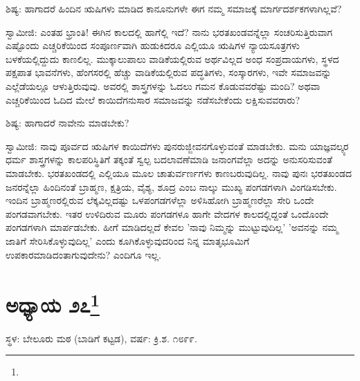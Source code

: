 ಶಿಷ್ಯ: ಹಾಗಾದರೆ ಹಿಂದಿನ ಋಷಿಗಳು ಮಾಡಿದ ಕಾನೂನುಗಳೇ ಈಗ ನಮ್ಮ ಸಮಾಜಕ್ಕೆ ಮಾರ್ಗದರ್ಶಕಗಳಾಗಿಲ್ಲವೆ?

ಸ್ವಾಮೀಜಿ: ಎಂತಹ ಭ್ರಾಂತಿ! ಈಗಿನ ಕಾಲದಲ್ಲಿ ಹಾಗೆಲ್ಲಿ ಇದೆ? ನಾನು ಭರತಖಂಡವನ್ನೆಲ್ಲಾ ಸಂಚರಿಸುತ್ತಿರುವಾಗ ಎಷ್ಟೊಂದು ಎಚ್ಚರಿಕೆಯಿಂದ ಸಂಪೂರ್ಣವಾಗಿ ಹುಡುಕಿದರೂ ಎಲ್ಲಿಯೂ ಋಷಿಗಳ ನ್ಯಾಯಸೂತ್ರಗಳು ಬಳಕೆಯಲ್ಲಿದ್ದುದು ಕಾಣಲಿಲ್ಲ. ಮುಕ್ಕಾಲುಪಾಲು ವಾಡಿಕೆಯಲ್ಲಿರುವ ಅರ್ಥವಿಲ್ಲದ ಅಂಧ ಸಂಪ್ರದಾಯಗಳು, ಸ್ಥಳದ ಪಕ್ಷಪಾತ ಭಾವನೆಗಳು, ಹೆಂಗಸರಲ್ಲಿ ಹೆಚ್ಚು ವಾಡಿಕೆಯಲ್ಲಿರುವ ಪದ್ಧತಿಗಳು, ಸಂಸ್ಕಾರಗಳು, ಇವೇ ಸಮಾಜವನ್ನು ಎಲ್ಲೆಡೆಯಲ್ಲೂ ಆಳುತ್ತಿರುವುವು. ಅವರಲ್ಲಿ ಶಾಸ್ತ್ರಗಳನ್ನು ಓದಲು ಗಮನ ಕೊಡುವವರೆಷ್ಟು ಮಂದಿ? ಅಥವಾ ಎಚ್ಚರಿಕೆಯಿಂದ ಓದಿದ ಮೇಲೆ ಕಾಯಿದೆಗನುಸಾರ ಸಮಾಜವನ್ನು ನಡೆಸಬೇಕೆಂದು ಲಕ್ಷಿಸುವವರಾರು?

ಶಿಷ್ಯ: ಹಾಗಾದರೆ ನಾವೇನು ಮಾಡಬೇಕು?

ಸ್ವಾಮೀಜಿ: ನಾವು ಪೂರ್ವದ ಋಷಿಗಳ ಕಾಯಿದೆಗಳು ಪುನರುಜ್ಜೀವನಗೊಳ್ಳುವಂತೆ ಮಾಡಬೇಕು. ಮನು ಯಾಜ್ಞವಲ್ಕ್ಯರ ಧರ್ಮ ಶಾಸ್ತ್ರಗಳನ್ನು ಕಾಲಪರಿಸ್ಥಿತಿಗೆ ತಕ್ಕಂತೆ ಸ್ವಲ್ಪ ಬದಲಾವಣೆಮಾಡಿ ಜನಾಂಗವೆಲ್ಲಾ ಅದನ್ನು ಅನುಸರಿಸುವಂತೆ ಮಾಡಬೇಕು. ಭರತಖಂಡದಲ್ಲಿ ಎಲ್ಲಿಯೂ ಮೂಲ ಚಾತುರ್ವರ್ಣಗಳು ಕಾಣಬರುವುದಿಲ್ಲ. ನಾವು ಪುನಃ ಭರತಖಂಡದ ಜನರನ್ನೆಲ್ಲಾ ಹಿಂದಿನಂತೆ ಬ್ರಾಹ್ಮಣ, ಕ್ಷತ್ರಿಯ, ವೈಶ್ಯ, ಶೂದ್ರ ಎಂಬ ನಾಲ್ಕು ಮುಖ್ಯ ಪಂಗಡಗಳಾಗಿ ವಿಂಗಡಿಸಬೇಕು. ಇಂದಿನ ಬ್ರಾಹ್ಮಣರಲ್ಲಿರುವ ಲೆಕ್ಕವಿಲ್ಲದಷ್ಟು ಒಳಪಂಗಡಗಳೆಲ್ಲಾ ಅಳಿಸಿಹೋಗಿ ಬ್ರಾಹ್ಮಣರೆಲ್ಲಾ ಸೇರಿ ಒಂದೇ ಪಂಗಡವಾಗಬೇಕು. ಇತರ ಉಳಿದಿರುವ ಮೂರು ಪಂಗಡಗಳೂ ಹಾಗೇ ವೇದಗಳ ಕಾಲದಲ್ಲಿದ್ದಂತೆ ಒಂದೊಂದೇ ಪಂಗಡಗಳಾಗಿ ಮಾರ್ಪಡಬೇಕು. ಹೀಗೆ ಮಾಡಿದಲ್ಲದೆ ಕೇವಲ 'ನಾವು ನಿಮ್ಮನ್ನು ಮುಟ್ಟುವುದಿಲ್ಲ' 'ಅವನನ್ನು ನಮ್ಮ ಜಾತಿಗೆ ಸೇರಿಸಿಕೊಳ್ಳುವುದಿಲ್ಲ' ಎಂದು ಕೂಗಿಕೊಳ್ಳುವುದರಿಂದ ನಿನ್ನ ಮಾತೃಭೂಮಿಗೆ ಉಪಕಾರಮಾಡಿದಂತಾಗುವುದೇನು? ಎಂದಿಗೂ ಇಲ್ಲ.

\newpage

\chapter[ಅಧ್ಯಾಯ ೨೭]{ಅಧ್ಯಾಯ ೨೭\protect\footnote{}}

\begin{center}
ಸ್ಥಳ: ಬೇಲೂರು ಮಠ (ಬಾಡಿಗೆ ಕಟ್ಟಡ), ವರ್ಷ: ಕ್ರಿ.ಶ. ೧೮೯೯.
\end{center}

